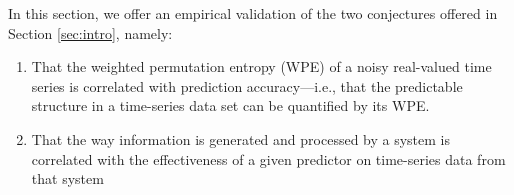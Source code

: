 


In this section, we offer an empirical validation of the two
conjectures offered in Section \ref{sec:intro}, namely:

\begin{enumerate}

\item That the weighted permutation entropy (WPE) of a noisy
  real-valued time series is correlated with prediction
  accuracy---i.e., that the predictable structure in a time-series
  data set can be quantified by its WPE.



\item That the way information is generated and processed by a system
  is correlated with the effectiveness of a given predictor on
  time-series data from that system



\end{enumerate}

